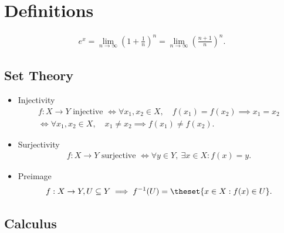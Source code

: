 \hypertarget{definitions-3}{%
\section{Definitions}\label{definitions-3}}

\begin{align*}  
e^x = \lim_{n \to \infty} \left(1 + \frac{1}{n}\right)^n = \lim_{n \to \infty} \left( \frac{n+1}{n} \right)^n
.\end{align*}

\hypertarget{set-theory}{%
\subsection{Set Theory}\label{set-theory}}

\begin{itemize}
\item
  Injectivity
  \begin{align*}  
  f:X \to Y \text{ injective } \iff \forall x_1,x_2 \in X,\quad  f(x_1) = f(x_2) \implies x_1 = x_2 \\ \iff \forall x_1,x_2 \in X,\quad x_1 \neq x_2 \implies f(x_1) \neq f(x_2)
  .\end{align*}
\item
  Surjectivity
  \begin{align*}  
  f:X \to Y \text{ surjective } \iff \forall y\in Y,~ \exists x\in X : f(x) = y
  .\end{align*}
\item
  Preimage
  \begin{align*}  
  f:X \to Y, U \subseteq Y \implies f^{-1}(U) = \theset{x \in X : f(x) \in U}
  .\end{align*}
\end{itemize}

\hypertarget{calculus}{%
\subsection{Calculus}\label{calculus}}

